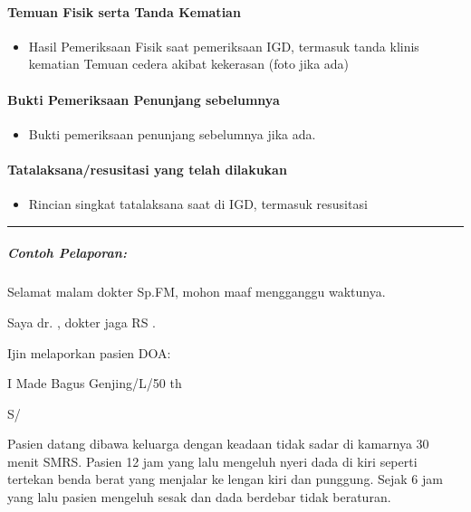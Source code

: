 \documentclass[
]{book}
\providecommand{\tightlist}{%
  \setlength{\itemsep}{0pt}\setlength{\parskip}{0pt}}
\begin{document}
\hypertarget{temuan-fisik-serta-tanda-kematian}{%
\paragraph{Temuan Fisik serta Tanda Kematian}\label{temuan-fisik-serta-tanda-kematian}}

\begin{itemize}
\tightlist
\item
  Hasil Pemeriksaan Fisik saat pemeriksaan IGD, termasuk tanda klinis kematian Temuan cedera akibat kekerasan (foto jika ada)
\end{itemize}

\hypertarget{bukti-pemeriksaan-penunjang-sebelumnya}{%
\paragraph{Bukti Pemeriksaan Penunjang sebelumnya}\label{bukti-pemeriksaan-penunjang-sebelumnya}}

\begin{itemize}
\tightlist
\item
  Bukti pemeriksaan penunjang sebelumnya jika ada.
\end{itemize}

\hypertarget{tatalaksanaresusitasi-yang-telah-dilakukan}{%
\paragraph{Tatalaksana/resusitasi yang telah dilakukan}\label{tatalaksanaresusitasi-yang-telah-dilakukan}}

\begin{itemize}
\tightlist
\item
  Rincian singkat tatalaksana saat di IGD, termasuk resusitasi
\end{itemize}

\begin{center}\rule{0.5\linewidth}{0.5pt}\end{center}

\hypertarget{contoh-pelaporan}{%
\subparagraph{Contoh Pelaporan:}\label{contoh-pelaporan}}

Selamat malam dokter Sp.FM, mohon maaf mengganggu waktunya.

Saya dr. , dokter jaga RS .

Ijin melaporkan pasien DOA:

I Made Bagus Genjing/L/50 th

S/

Pasien datang dibawa keluarga dengan keadaan tidak sadar di kamarnya 30 menit SMRS. Pasien 12 jam yang lalu mengeluh nyeri dada di kiri seperti tertekan benda berat yang menjalar ke lengan kiri dan punggung. Sejak 6 jam yang lalu pasien mengeluh sesak dan dada berdebar tidak beraturan.
\end{document}
